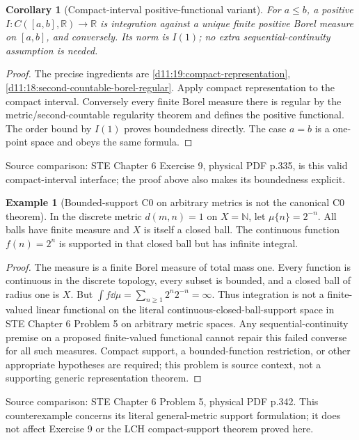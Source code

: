 \documentclass[11pt,oneside,openany]{book}
\newtheorem{corollary}[theorem]{Corollary}
\theoremstyle{definition}
\newtheorem{example}[theorem]{Example}
\theoremstyle{remark}
\newcommand{\R}{\mathbb R}\newcommand{\C}{\mathbb C}
\newcommand{\N}{\mathbb N}\newcommand{\Z}{\mathbb Z}\newcommand{\Q}{\mathbb Q}
\newcommand{\family}[1]{}
\newcommand{\source}[1]{\par\begingroup\small\sffamily\color{black!65}Source comparison: #1\par\endgroup}
\begin{document}
\begin{corollary}[Compact-interval positive-functional variant]\family{D11.19.stein_exercise9_interface}\label{d11:19:stein-exercise9-interface}
For $a\le b$, a positive $I:C([a,b],\R)\to\R$ is integration against a unique finite positive Borel measure on $[a,b]$, and conversely. Its norm is $I(1)$; no extra sequential-continuity assumption is needed.
\end{corollary}
\begin{proof}
The precise ingredients are \cref{d11:19:compact-representation}, \cref{d11:18:second-countable-borel-regular}. Apply compact representation to the compact interval. Conversely every finite Borel measure there is regular by the metric/second-countable regularity theorem and defines the positive functional. The order bound by $I(1)$ proves boundedness directly. The case $a=b$ is a one-point space and obeys the same formula.
\end{proof}
\source{STE Chapter 6 Exercise 9, physical PDF p.335, is this valid compact-interval interface; the proof above also makes its boundedness explicit.}

\begin{example}[Bounded-support C0 on arbitrary metrics is not the canonical C0 theorem]\family{D11.19.stein_problem5_caution}\label{d11:19:stein-problem5-caution}
In the discrete metric $d(m,n)=1$ on $X=\N$, let $\mu\{n\}=2^{-n}$. All balls have finite measure and $X$ is itself a closed ball. The continuous function $f(n)=2^n$ is supported in that closed ball but has infinite integral.
\end{example}
\begin{proof}
The measure is a finite Borel measure of total mass one. Every function is continuous in the discrete topology, every subset is bounded, and a closed ball of radius one is $X$. But $\int f\dd\mu=\sum_{n\ge1}2^n2^{-n}=\infty$. Thus integration is not a finite-valued linear functional on the literal continuous-closed-ball-support space in STE Chapter 6 Problem 5 on arbitrary metric spaces. Any sequential-continuity premise on a proposed finite-valued functional cannot repair this failed converse for all such measures. Compact support, a bounded-function restriction, or other appropriate hypotheses are required; this problem is source context, not a supporting generic representation theorem.
\end{proof}
\source{STE Chapter 6 Problem 5, physical PDF p.342. This counterexample concerns its literal general-metric support formulation; it does not affect Exercise 9 or the LCH compact-support theorem proved here.}
\end{document}

